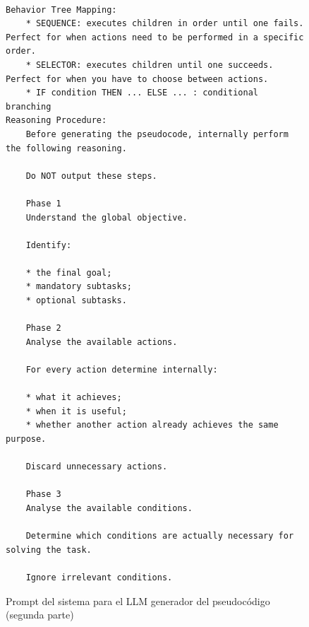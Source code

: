 \begin{figure}[htbp]
  \begin{verbatim}

Behavior Tree Mapping:
    * SEQUENCE: executes children in order until one fails. Perfect for when actions need to be performed in a specific order.
    * SELECTOR: executes children until one succeeds. Perfect for when you have to choose between actions.
    * IF condition THEN ... ELSE ... : conditional branching
Reasoning Procedure:
    Before generating the pseudocode, internally perform the following reasoning.

    Do NOT output these steps.

    Phase 1
    Understand the global objective.

    Identify:

    * the final goal;
    * mandatory subtasks;
    * optional subtasks.

    Phase 2
    Analyse the available actions.

    For every action determine internally:

    * what it achieves;
    * when it is useful;
    * whether another action already achieves the same purpose.

    Discard unnecessary actions.

    Phase 3
    Analyse the available conditions.

    Determine which conditions are actually necessary for solving the task.

    Ignore irrelevant conditions.
\end{verbatim}
  \caption{Prompt del sistema para el LLM generador del pseudocódigo (segunda parte)}
\end{figure}

